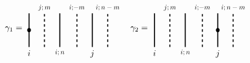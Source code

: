 \begin{equation*}
 \gamma_1=\begin{tikzpicture}[very thick,scale=.7,baseline,xscale=.9]       \draw (0,0)
      +(1,-1) -- +(1,1) node[below,at start,scale=.8]{$i;n$};  \fill (-1,0) circle (3.5pt);\draw (0,0)
      +(-1,-1) -- +(-1,1) node[below,at start]{$i$}; \draw[dashed] (0,0)
      +(0,-1) -- node[above, at end,scale=.8]{$j;m$}+(0,1); 
    \end{tikzpicture} \begin{tikzpicture}[very
      thick,scale=.7,baseline,xscale=.9]  \draw[dashed] (1,0) +(1,-1) -- +(1,1)
      node[above,at end,scale=.8]{$i;n-m$}; \draw[dashed] (1,0) +(-1,-1) --+(-1,1)
      node[above,at end,scale=.8]{$i;\!-m$}; \draw (1,0) +(0,-1) -- node[below, at start]{$j$}+(0,1); 
    \end{tikzpicture}
    \quad  \gamma_2= \begin{tikzpicture}[very thick,scale=.7,baseline,xscale=.9]       \draw (0,0)
      +(1,-1) -- +(1,1) node[below,at start,scale=.8]{$i;n$};  \draw (0,0)
      +(-1,-1) -- +(-1,1) node[below,at start]{$i$}; \draw[dashed] (0,0)
      +(0,-1) -- node[above, at end,scale=.8]{$j;m$}+(0,1); 
    \end{tikzpicture}\begin{tikzpicture}[very
      thick,scale=.7,baseline,xscale=.9]  \draw[dashed] (1,0) +(1,-1) -- +(1,1)
      node[above,at end,scale=.8]{$i;n-m$}; \draw[dashed] (1,0) +(-1,-1) --+(-1,1)
      node[above,at end,scale=.8]{$i;\!-m$}; \draw (1,0) +(0,-1) -- node[below, at start]{$j$}+(0,1); \fill (1,0) circle (3.5pt);
    \end{tikzpicture}

\end{equation*}
